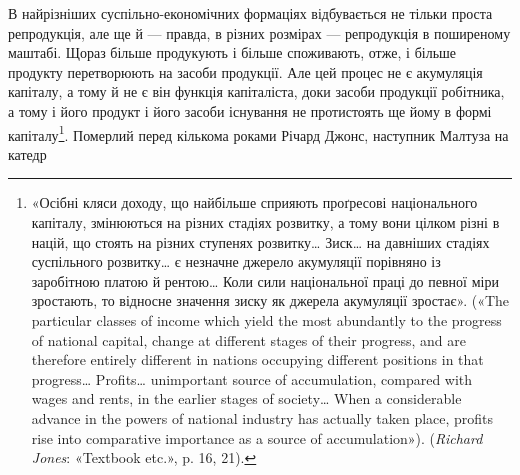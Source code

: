 В найрізніших суспільно-економічних формаціях відбувається
не тільки проста репродукція, але ще й — правда, в різних
розмірах — репродукція в поширеному маштабі. Щораз більше
продукують і більше споживають, отже, і більше продукту перетворюють
на засоби продукції. Але цей процес не є акумуляція
капіталу, а тому й не є він функція капіталіста, доки засоби продукції
робітника, а тому і його продукт і його засоби існування
не протистоять ще йому в формі
капіталу\footnote{\label{footnote-47}«Осібні кляси доходу, що найбільше сприяють проґресові національного
капіталу, змінюються на різних стадіях розвитку, а тому вони
цілком різні в націй, що стоять на різних ступенях розвитку\dots{} Зиск\dots{}
на давніших стадіях суспільного розвитку\dots{} є незначне джерело акумуляції
порівняно із заробітною платою й рентою\dots{} Коли сили національної
праці до певної міри зростають, то відносне значення зиску як
джерела акумуляції зростає». («The particular classes of income which
yield the most abundantly to the progress of national capital, change at
different stages of their progress, and are therefore entirely different in
nations occupying different positions in that progress\dots{} Profits\dots{} unimportant
source of accumulation, compared with wages and rents, in the
earlier stages of society\dots{} When a considerable advance in the powers of
national industry has actually taken place, profits rise into comparative
importance as a source of accumulation»). (\emph{Richard Jones}: «Textbook
etc.», p. 16, 21).
}. Померлий перед
кількома роками Річард Джонс, наступник Малтуза на катедр
\parbreak{}  %
